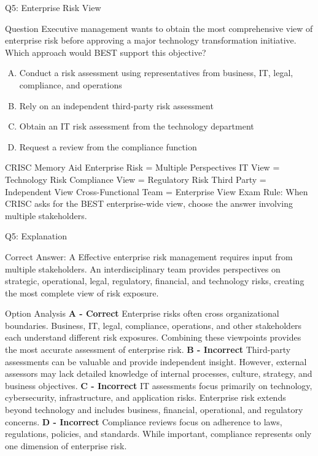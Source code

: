 \documentclass{beamer}
\begin{document}
	
	\begin{frame}{Q5: Enterprise Risk View} \begin{block}{Question} Executive management wants to obtain the most comprehensive view of enterprise risk before approving a major technology transformation initiative. Which approach would BEST support this objective? \end{block} \begin{enumerate}[(A)] \item Conduct a risk assessment using representatives from business, IT, legal, compliance, and operations \item Rely on an independent third-party risk assessment \item Obtain an IT risk assessment from the technology department \item Request a review from the compliance function \end{enumerate}  \begin{block}{CRISC Memory Aid} Enterprise Risk = Multiple Perspectives IT View = Technology Risk Compliance View = Regulatory Risk Third Party = Independent View Cross-Functional Team = Enterprise View \vspace{0.15cm} Exam Rule: When CRISC asks for the BEST enterprise-wide view, choose the answer involving multiple stakeholders. \end{block}  \end{frame} \begin{frame}{Q5: Explanation} \footnotesize \begin{block}{Correct Answer: A} Effective enterprise risk management requires input from multiple stakeholders. An interdisciplinary team provides perspectives on strategic, operational, legal, regulatory, financial, and technology risks, creating the most complete view of risk exposure. \end{block} \begin{block}{Option Analysis} \textbf{A - Correct} Enterprise risks often cross organizational boundaries. Business, IT, legal, compliance, operations, and other stakeholders each understand different risk exposures. Combining these viewpoints provides the most accurate assessment of enterprise risk. \vspace{0.15cm} \textbf{B - Incorrect} Third-party assessments can be valuable and provide independent insight. However, external assessors may lack detailed knowledge of internal processes, culture, strategy, and business objectives. \vspace{0.15cm} \textbf{C - Incorrect} IT assessments focus primarily on technology, cybersecurity, infrastructure, and application risks. Enterprise risk extends beyond technology and includes business, financial, operational, and regulatory concerns. \vspace{0.15cm} \textbf{D - Incorrect} Compliance reviews focus on adherence to laws, regulations, policies, and standards. While important, compliance represents only one dimension of enterprise risk. \end{block}\end{frame}
	
\end{document}
